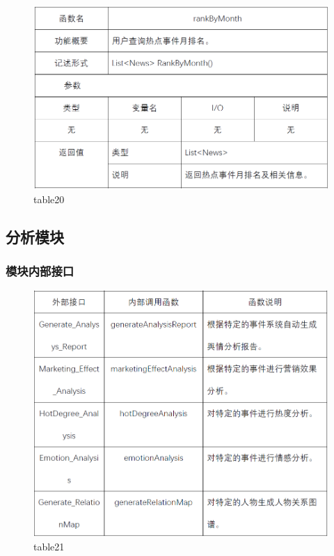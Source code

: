 \begin{figure}[!htbp]
	\centering
	\includegraphics[scale=0.7]{image/b20.png} %
	\caption{table20} %
\end{figure}
\subsection{分析模块}
\subsubsection{模块内部接口}
\begin{figure}[!htbp]
	\centering
	\includegraphics[scale=0.7]{image/b21.png} %
	\caption{table21} %
\end{figure}
